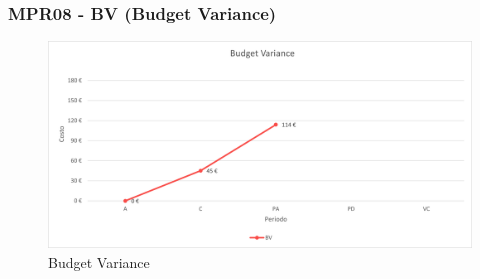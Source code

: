 \subsubsection{MPR08 - BV (Budget Variance)}
\begin{figure}[!ht]
    \caption{Budget Variance}
    \vspace{10px}
    \includegraphics[scale=0.5]{sezioni/immagini/BudgetVariance.png}
    \centering
\end{figure}
\pagebreak
